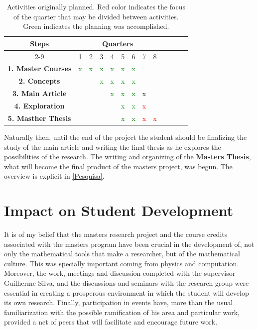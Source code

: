 \documentclass[12pt]{report}
\begin{document}
\begin{enumerate}
	\begin{table}[h!]
		\centering
		\begin{tabular}{|c|c|c|c|c|c|c|c|c|c|c|c|c|}
			\hline
			\multirow{2}{*}{{\bf Steps}} & \multicolumn{8}{c|}{{\bf Quarters}}
			\\ \cline{2-9}
			& 1 & 2 & 3 & 4 & 5 & 6 & 7 & 8
			\\ \hline
			{\bf 1. Master Courses} & \textcolor{green}{x} & \textcolor{green}{x} & \textcolor{green}{x} & \textcolor{green}{x} & \textcolor{green}{x}  & \textcolor{green}{x}  & & 
			\\ \hline
			{\bf 2. Concepts} &  &  & \textcolor{green}{x}  & \textcolor{green}{x}  & \textcolor{green}{x} & \textcolor{green}{x}  & &
			\\ \hline
			{\bf 3. Main Article} & & & & \textcolor{green}{x}  & \textcolor{green}{x}  & \textcolor{green}{x} & x &
			\\ \hline
			{\bf 4. Exploration} & & & & & \textcolor{green}{x} & \textcolor{green}{x} & \textcolor{red}{x} & 
			\\ \hline
			{\bf 5. Masther Thesis} & & & & & \textcolor{green}{x}  & \textcolor{green}{x} & \textcolor{red}{x} & \textcolor{red}{x}
			\\ \hline
		\end{tabular}
		\caption{Activities originally planned. Red color indicates the focus of the quarter that may be divided between activities. Green indicates the planning was accomplished.}
		\label{tab:cronograma1ano}
	\end{table}
	
	Naturally then, until the end of the project the student should be finalizing the study of the main article and writing the final thesis as he explores the possibilities of the research. The writing and organizing of the \textbf{Masters Thesis}, what will become the final product of the masters project, was begun. The overview is explicit in \ref{Pesquisa}.
	
\end{enumerate}

\section{Impact on Student Development}

It is of my belief that the masters research project and the course credits associated with the masters program have been crucial in the development of, not only the mathematical tools that make a researcher, but of the mathematical culture. This was specially important coming from physics and computation.  Moreover, the work, meetings and discussion completed with the supervisor Guilherme Silva, and the discussions and seminars with the research group were essential in creating a prosperous environment in which the student will develop its own research. Finally, participation in events have, more than the usual familiarization with the possible ramification of his area and particular work, provided a net of peers that will facilitate and encourage future work. 
\end{document}
